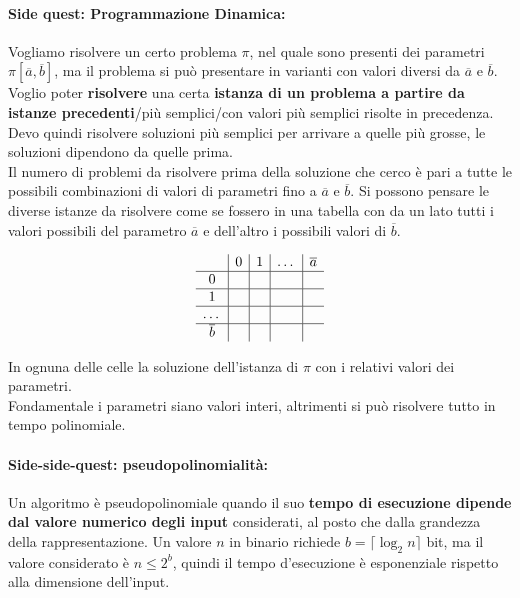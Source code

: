 \newpage

\paragraph{Side quest: Programmazione Dinamica:} Vogliamo risolvere un certo problema $\pi$, nel quale sono presenti dei parametri $\pi [\overline{a},\overline{b}]$, ma il problema si può presentare in varianti con valori diversi da $\overline{a}$ e $\overline{b}$.\\

Voglio poter \textbf{risolvere} una certa \textbf{istanza di un problema a partire da istanze precedenti}/più semplici/con valori più semplici risolte in precedenza.\\
Devo quindi risolvere soluzioni più semplici per arrivare a quelle più grosse, le soluzioni dipendono da quelle prima.\\

Il numero di problemi da risolvere prima della soluzione che cerco è pari a tutte le possibili combinazioni di valori di parametri fino a $\overline{a}$ e $\overline{b}$. Si possono pensare le diverse istanze da risolvere come se fossero in una tabella con da un lato tutti i valori possibili del parametro $\overline{a}$ e dell'altro i possibili valori di $\overline{b}$.

$$
\begin{array}{c | c | c | c | c }
	& 0 & 1 & \dots & \overline{a} \\
	\hline
	0 & & & & \\
	\hline
	1 & & & & \\
	\hline
	\dots & & & & \\
	\hline
	\overline{b} & & & &
\end{array}
$$

In ognuna delle celle la soluzione dell'istanza di $\pi$ con i relativi valori dei parametri.\\

Fondamentale i parametri siano valori interi, altrimenti si può risolvere tutto in tempo polinomiale.\\

\paragraph{Side-side-quest: pseudopolinomialità:} Un algoritmo è pseudopolinomiale quando il suo \textbf{tempo di esecuzione dipende dal valore numerico degli input} considerati, al posto che dalla grandezza della rappresentazione. Un valore $n$ in binario richiede $b = \lceil \log_2 n \rceil$ bit, ma il valore considerato è $n \leq 2^b$, quindi il tempo d'esecuzione è esponenziale rispetto alla dimensione dell'input.\\

